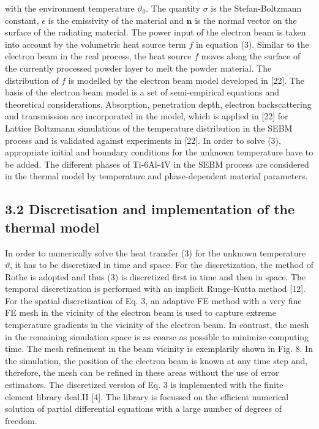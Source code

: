 \documentclass[10pt]{article}
\begin{document}
with the environment temperature $\vartheta_{0}$. The quantity $\sigma$ is the Stefan-Boltzmann constant, $\epsilon$ is the emissivity of the material and $\boldsymbol{n}$ is the normal vector on the surface of the radiating material. The power input of the electron beam is taken into account by the volumetric heat source term $f$ in equation (3). Similar to the electron beam in the real process, the heat source $f$ moves along the surface of the currently processed powder layer to melt the powder material. The distribution of $f$ is modelled by the electron beam model developed in [22]. The basis of the electron beam model is a set of semi-empirical equations and theoretical considerations. Absorption, penetration depth, electron backscattering and transmission are incorporated in the model, which is applied in [22] for Lattice Boltzmann simulations of the temperature distribution in the SEBM process and is validated against experiments in [22]. In order to solve (3), appropriate initial and boundary conditions for the unknown temperature have to be added. The different phases of Ti-6Al-4V in the SEBM process are considered in the thermal model by temperature and phase-dependent material parameters.

\subsection*{3.2 Discretisation and implementation of the thermal model}
In order to numerically solve the heat transfer (3) for the unknown temperature $\vartheta$, it has to be discretized in time and space. For the discretization, the method of Rothe is adopted and thus (3) is discretized first in time and then in space. The temporal discretization is performed with an implicit Runge-Kutta method [12]. For the spatial discretization of Eq. 3, an adaptive FE method with a very fine FE mesh in the vicinity of the electron beam is used to capture extreme temperature gradients in the vicinity of the electron beam. In contrast, the mesh in the remaining simulation space is as coarse as possible to minimize computing time. The mesh refinement in the beam vicinity is exemplarily shown in Fig. 8. In the simulation, the position of the electron beam is known at any time step and, therefore, the mesh can be refined in these areas without the use of error estimators. The discretized version of Eq. 3 is implemented with the finite element library deal.II [4]. The library is focussed on the efficient numerical solution of partial differential equations with a large number of degrees of freedom.
\end{document}
